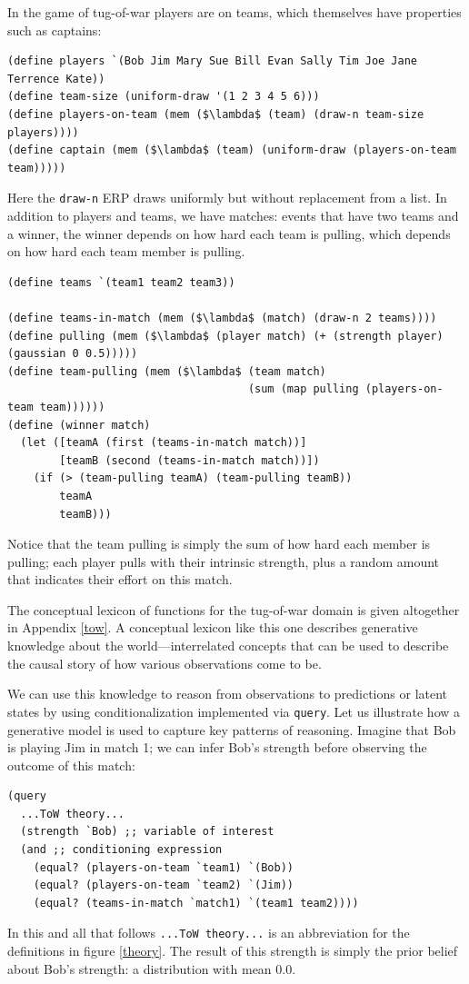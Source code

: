 \documentclass[12pt]{article}
\begin{document}
In the game of tug-of-war players are on teams, which themselves have properties such as captains:
\begin{lstlisting}[mathescape]
(define players `(Bob Jim Mary Sue Bill Evan Sally Tim Joe Jane Terrence Kate))
(define team-size (uniform-draw '(1 2 3 4 5 6)))
(define players-on-team (mem ($\lambda$ (team) (draw-n team-size players))))
(define captain (mem ($\lambda$ (team) (uniform-draw (players-on-team team)))))
\end{lstlisting}
Here the \lstinline{draw-n} ERP draws uniformly but without replacement from a list.
%
In addition to players and teams, we have matches: events that have two teams and a winner, the winner depends on how hard each team is pulling, which depends on how hard each team member is pulling.
\begin{lstlisting}[mathescape]
(define teams `(team1 team2 team3))

(define teams-in-match (mem ($\lambda$ (match) (draw-n 2 teams))))
(define pulling (mem ($\lambda$ (player match) (+ (strength player) (gaussian 0 0.5)))))
(define team-pulling (mem ($\lambda$ (team match) 
                                     (sum (map pulling (players-on-team team))))))
(define (winner match) 
  (let ([teamA (first (teams-in-match match))]
        [teamB (second (teams-in-match match))])
    (if (> (team-pulling teamA) (team-pulling teamB))
        teamA
        teamB)))
\end{lstlisting}
Notice that the team pulling is simply the sum of how hard each member is pulling; each player pulls with their intrinsic strength, plus a random amount that indicates their effort on this match. 
 
The conceptual lexicon of functions for the tug-of-war domain is given altogether in Appendix \ref{tow}.
A conceptual lexicon like this one describes generative knowledge about the world---interrelated concepts that can be used to describe the causal story of how various observations come to be. 

We can use this knowledge to reason from observations to predictions or latent states by using conditionalization implemented via \lstinline{query}. 
Let us illustrate how a generative model is used to capture key patterns of reasoning. 
Imagine that Bob is playing Jim in match 1; we can infer Bob's strength before observing the outcome of this match:
\begin{lstlisting}[mathescape]
(query
  ...ToW theory...
  (strength `Bob) ;; variable of interest
  (and ;; conditioning expression 
    (equal? (players-on-team `team1) `(Bob))
    (equal? (players-on-team `team2) `(Jim))
    (equal? (teams-in-match `match1) `(team1 team2))))
\end{lstlisting}
In this and all that follows \lstinline{...ToW theory...} is an abbreviation for the definitions in figure \ref{theory}. 
The result of this strength is simply the prior belief about Bob's strength: a distribution with mean 0.0.
\end{document}
